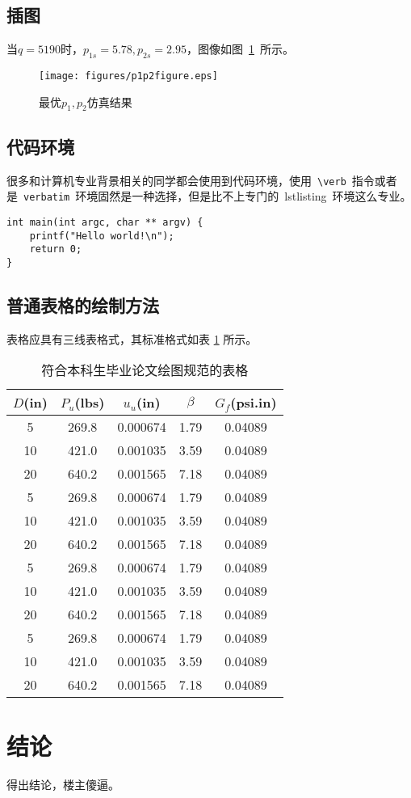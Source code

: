 \section{插图}

当$q=5190$时，$p_{1s}=5.78,p_{2s}=2.95$，图像如图~\ref{fig:simuP1P2Result}~所示。
\begin{figure}[htbp!]
\centering
\texttt{[image: figures/p1p2figure.eps]}
\caption{最优$p_1, p_2$仿真结果}\label{fig:simuP1P2Result}
\vspace{-1em}
\end{figure}

\section{代码环境}

很多和计算机专业背景相关的同学都会使用到代码环境，使用~\verb|\verb|~指令或者是~\verb|verbatim|~环境固然是一种选择，但是比不上专门的~lstlisting~环境这么专业。

\begin{lstlisting}
int main(int argc, char ** argv) {
    printf("Hello world!\n");
    return 0;
}
\end{lstlisting}

\section{普通表格的绘制方法}

表格应具有三线表格式，其标准格式如表 \ref{tab:table1} 所示。
\begin{table}[htbp]
\caption{符合本科生毕业论文绘图规范的表格}\label{tab:table1}
\vspace{0.5em}\centering\wuhao
\begin{tabular}{ccccc}
\toprule[1.5pt]
$D$(in) & $P_u$(lbs) & $u_u$(in) & $\beta$ & $G_f$(psi.in)\\
\midrule[1pt]
 5 & 269.8 & 0.000674 & 1.79 & 0.04089\\
10 & 421.0 & 0.001035 & 3.59 & 0.04089\\
20 & 640.2 & 0.001565 & 7.18 & 0.04089\\
 5 & 269.8 & 0.000674 & 1.79 & 0.04089\\
10 & 421.0 & 0.001035 & 3.59 & 0.04089\\
20 & 640.2 & 0.001565 & 7.18 & 0.04089\\
 5 & 269.8 & 0.000674 & 1.79 & 0.04089\\
10 & 421.0 & 0.001035 & 3.59 & 0.04089\\
20 & 640.2 & 0.001565 & 7.18 & 0.04089\\
 5 & 269.8 & 0.000674 & 1.79 & 0.04089\\
10 & 421.0 & 0.001035 & 3.59 & 0.04089\\
20 & 640.2 & 0.001565 & 7.18 & 0.04089\\
\bottomrule[1.5pt]
\end{tabular}
\vspace{\baselineskip}
\end{table}



\chapter*{结\quad 论}

得出结论，楼主傻逼。
